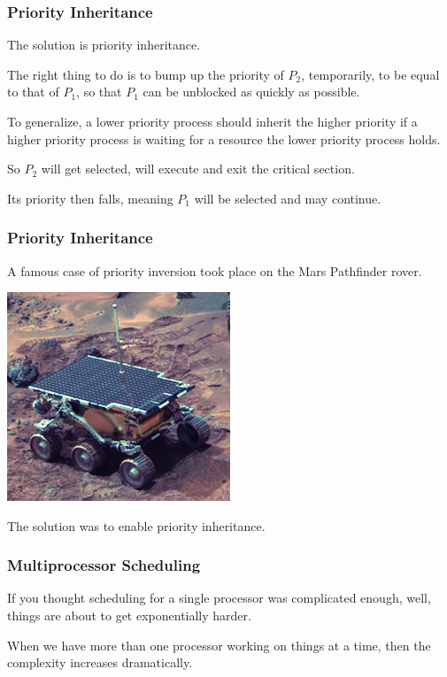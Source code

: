 \begin{frame}
\frametitle{Priority Inheritance}

The solution is \alert{priority inheritance}. 

The right thing to do is to bump up the priority of $P_{2}$, temporarily, to be equal to that of $P_{1}$, so that $P_{1}$ can be unblocked as quickly as possible. 

To generalize, a lower priority process should inherit the higher priority if a higher priority process is waiting for a resource the lower priority process holds. 

So $P_{2}$ will get selected, will execute and exit the critical section. 

Its priority then falls, meaning $P_{1}$ will be selected and may continue.

\end{frame}

\begin{frame}
\frametitle{Priority Inheritance}

A famous case of priority inversion took place on the Mars Pathfinder rover.

\begin{center}
	\includegraphics[width=0.5\textwidth]{images/pathfinder.jpg}
\end{center}

The solution was to enable priority inheritance.

\end{frame}

\begin{frame}
\frametitle{Multiprocessor Scheduling}

If you thought scheduling for a single processor was complicated enough, well, things are about to get exponentially harder. 

When we have more than one processor working on things at a time, then the complexity increases dramatically. 


\end{frame}

